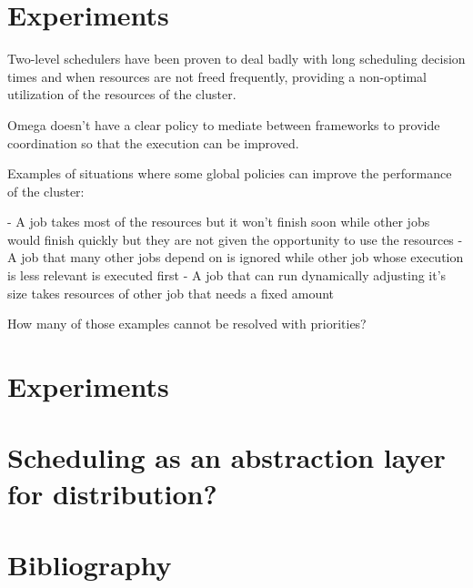 \documentclass{svjour3}                     %
\begin{document}
\section{Experiments}
Two-level schedulers have been proven to deal badly with long scheduling decision times and
when resources are not freed frequently, providing a non-optimal utilization of the resources
of the cluster.

Omega doesn't have a clear policy to mediate between frameworks to provide coordination so 
that the execution can be improved.

Examples of situations where some global policies can improve the performance of the cluster:

 - A job takes most of the resources but it won't finish soon while other jobs would finish
   quickly but they are not given the opportunity to use the resources
 - A job that many other jobs depend on is ignored while other job whose execution is less
   relevant is executed first
 - A job that can run dynamically adjusting it's size takes resources of other job that needs
  a fixed amount

How many of those examples cannot be resolved with priorities? 


\section{Experiments}

\section{Scheduling as an abstraction layer for distribution?}





\section{Bibliography}


\printbibliography
\end{document}
